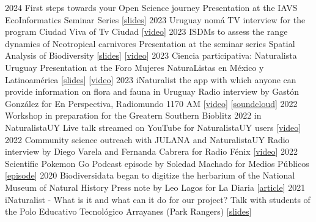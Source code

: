 \documentclass[9pt]{developercv} %
\begin{document}
\begin{entrylist}
	\entrylong
		{2024}
		{First steps towards your Open Science journey}
		{}
		{Presentation at the IAVS EcoInformatics Seminar Series [\href{https://flograttarola.com/talk/first-steps-towards-your-open-science-journey/IAVS-EcoInfo_OpenScience_Flo.pdf}{slides}]}
	\entrylong
		{2023}
		{Uruguay nomá}
		{}
		{TV interview for the program Ciudad Viva of Tv Ciudad [\href{https://youtu.be/Edfpt810rt0}{video}]}
	\entrylong
		{2023}
		{ISDMs to assess the range dynamics of Neotropical carnivores}
		{}
		{Presentation at the seminar series Spatial Analysis of Biodiversity [\href{https://flograttarola.com/Modelado_de_NE_y_DG.pdf}{slides}] [\href{https://www.youtube.com/live/F0BpYC3iE4g}{video}]}
	\entrylong
		{2023}
		{Ciencia participativa: Naturalista Uruguay}
		{}
		{Presentation at the Foro Mujeres NaturaListas en México y Latinoamérica [\href{https://flograttarola.com/talk/ciencia-participativa-y-naturalista-uruguay/Foro_mujeres_Mexico_y_Latam.pdf}{slides}] [\href{https://fb.watch/iBdjBHYFQm/}{video}]}
	\entrylong
		{2023}
		{iNaturalist the app with which anyone can provide information on flora and fauna in Uruguay}
		{}
		{Radio interview by Gastón González for En Perspectiva, Radiomundo 1170 AM [\href{https://youtu.be/TcYk9ZquyvE}{video}] [\href{https://soundcloud.com/en-perspectiva-uy/entrevista-florencia-grattarola-naturalistauy-te-invita-a-realizar-ciencia-ciudadana}{soundcloud}]}
	\entrylong
		{2022}
		{Workshop in preparation for the Greatern Southern Bioblitz 2022 in NaturalistaUY}
		{}
		{Live talk streamed on YouTube for NaturalistaUY users [\href{https://youtu.be/sPKhUy3CJQ0}{video}]}
	\entrylong
		{2022}
		{Community science outreach with JULANA and NaturalistaUY}
		{}
		{Radio interview by Diego Varela and Fernanda Cabrera for Radio Fénix [\href{https://youtu.be/Scc01vg1PTs}{video}]}
	\entrylong
		{2022}
		{Scientific Pokemon Go}
		{}
		{Podcast episode by Soledad Machado for Medios Públicos [\href{https://open.spotify.com/episode/05X1u40HyvvTjuuYKjyJE2?si=jCNZ8hHmQ8S-CSfiNOCryQ}{episode}]}
	\entrylong
		{2020}
		{Biodiversidata began to digitize the herbarium of the National Museum of Natural History}
		{}
		{Press note by Leo Lagos for La Diaria [\href{https://ladiaria.com.uy/ciencia/articulo/2020/2/biodiversidata-comenzo-a-digitalizar-el-herbario-del-museo-nacional-de-historia-natural/}{article}]}
	\entrylong
		{2021}
		{iNaturalist - What is it and what can it do for our project?}
		{}
		{Talk with students of the Polo Educativo Tecnológico Arrayanes (Park Rangers) [\href{https://flograttarola.com/pdf/Arrayanes_iNatUY.pdf}{slides}]}

\end{entrylist}
\end{document}
